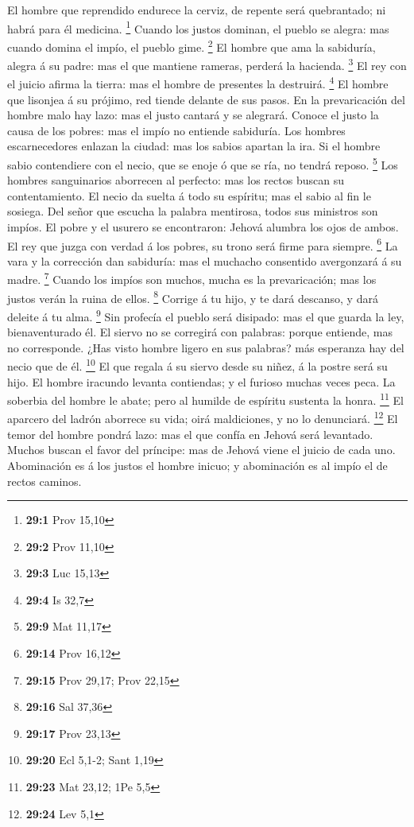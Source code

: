  El hombre que reprendido endurece la cerviz, de repente
será quebrantado; ni habrá para él medicina. \footnote{\textbf{29:1}
  Prov 15,10}  Cuando los justos dominan, el pueblo se
alegra: mas cuando domina el impío, el pueblo gime. \footnote{\textbf{29:2}
  Prov 11,10}  El hombre que ama la sabiduría, alegra á su
padre: mas el que mantiene rameras, perderá la hacienda. \footnote{\textbf{29:3}
  Luc 15,13}  El rey con el juicio afirma la tierra: mas
el hombre de presentes la destruirá. \footnote{\textbf{29:4} Is 32,7}
 El hombre que lisonjea á su prójimo, red tiende delante
de sus pasos.  En la prevaricación del hombre malo hay
lazo: mas el justo cantará y se alegrará.  Conoce el justo
la causa de los pobres: mas el impío no entiende sabiduría.
 Los hombres escarnecedores enlazan la ciudad: mas los
sabios apartan la ira.  Si el hombre sabio contendiere con
el necio, que se enoje ó que se ría, no tendrá reposo. \footnote{\textbf{29:9}
  Mat 11,17}  Los hombres sanguinarios aborrecen al
perfecto: mas los rectos buscan su contentamiento.  El
necio da suelta á todo su espíritu; mas el sabio al fin le sosiega.
 Del señor que escucha la palabra mentirosa, todos sus
ministros son impíos.  El pobre y el usurero se
encontraron: Jehová alumbra los ojos de ambos.  El rey
que juzga con verdad á los pobres, su trono será firme para siempre.
\footnote{\textbf{29:14} Prov 16,12}  La vara y la
corrección dan sabiduría: mas el muchacho consentido avergonzará á su
madre. \footnote{\textbf{29:15} Prov 29,17; Prov 22,15} 
Cuando los impíos son muchos, mucha es la prevaricación; mas los justos
verán la ruina de ellos. \footnote{\textbf{29:16} Sal 37,36}
 Corrige á tu hijo, y te dará descanso, y dará deleite á
tu alma. \footnote{\textbf{29:17} Prov 23,13}  Sin
profecía el pueblo será disipado: mas el que guarda la ley,
bienaventurado él.  El siervo no se corregirá con
palabras: porque entiende, mas no corresponde.  ¿Has
visto hombre ligero en sus palabras? más esperanza hay del necio que de
él. \footnote{\textbf{29:20} Ecl 5,1-2; Sant 1,19}  El
que regala á su siervo desde su niñez, á la postre será su hijo.
 El hombre iracundo levanta contiendas; y el furioso
muchas veces peca.  La soberbia del hombre le abate; pero
al humilde de espíritu sustenta la honra. \footnote{\textbf{29:23} Mat
  23,12; 1Pe 5,5}  El aparcero del ladrón aborrece su
vida; oirá maldiciones, y no lo denunciará. \footnote{\textbf{29:24} Lev
  5,1}  El temor del hombre pondrá lazo: mas el que
confía en Jehová será levantado.  Muchos buscan el favor
del príncipe: mas de Jehová viene el juicio de cada uno. 
Abominación es á los justos el hombre inicuo; y abominación es al impío
el de rectos caminos.

